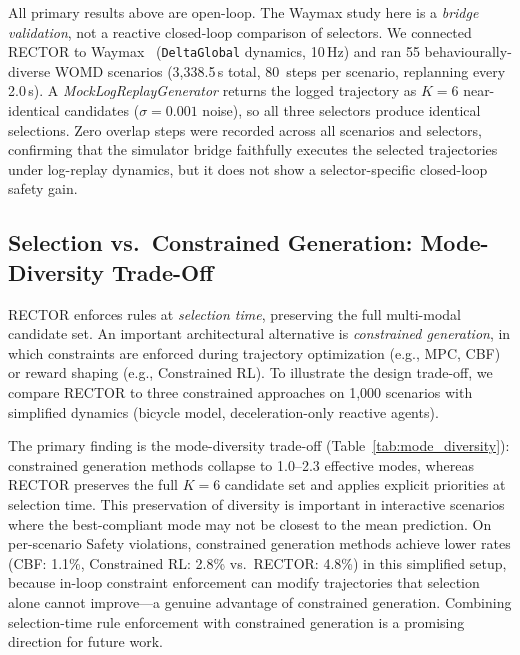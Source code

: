 All primary results above are open-loop.  The Waymax study here is a \emph{bridge validation}, not a reactive closed-loop comparison of selectors. We connected RECTOR to Waymax~\cite{gulino2024waymax} (\texttt{DeltaGlobal} dynamics, 10\,Hz) and ran 55 behaviourally-diverse WOMD scenarios (3{,}338.5\,s total, 80~steps per scenario, replanning every 2.0\,s).  A \emph{MockLogReplayGenerator} returns the logged trajectory as $K{=}6$ near-identical candidates ($\sigma{=}0.001$ noise), so all three selectors produce identical selections.  Zero overlap steps were recorded across all scenarios and selectors, confirming that the simulator bridge faithfully executes the selected trajectories under log-replay dynamics, but it does not show a selector-specific closed-loop safety gain.
\subsection{Selection vs.\ Constrained Generation: Mode-Diversity Trade-Off}
\label{subsec:constrained_baselines}

RECTOR enforces rules at \emph{selection time}, preserving the full multi-modal candidate set.  An important architectural alternative is \emph{constrained generation}, in which constraints are enforced during trajectory optimization (e.g., MPC, CBF) or reward shaping (e.g., Constrained RL).  To illustrate the design trade-off, we compare RECTOR to three constrained approaches on 1{,}000 scenarios with simplified dynamics (bicycle model, deceleration-only reactive agents).

The primary finding is the mode-diversity trade-off (Table~\ref{tab:mode_diversity}): constrained generation methods collapse to 1.0--2.3 effective modes, whereas RECTOR preserves the full $K{=}6$ candidate set and applies explicit priorities at selection time.  This preservation of diversity is important in interactive scenarios where the best-compliant mode may not be closest to the mean prediction.  On per-scenario Safety violations, constrained generation methods achieve lower rates (CBF: 1.1\%, Constrained RL: 2.8\% vs.\ RECTOR: 4.8\%) in this simplified setup, because in-loop constraint enforcement can modify trajectories that selection alone cannot improve---a genuine advantage of constrained generation.  Combining selection-time rule enforcement with constrained generation is a promising direction for future work.

